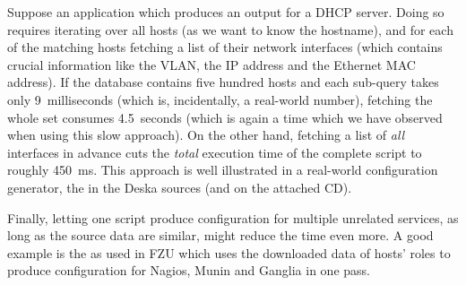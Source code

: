 \documentclass[deska]{subfiles}
\begin{document}
Suppose an application which produces an output for a DHCP server.  Doing so requires iterating over all hosts (as we
want to know the hostname), and for each of the matching hosts fetching a list of their network interfaces (which
contains crucial information like the VLAN, the IP address and the Ethernet MAC address).  If the database contains five
hundred hosts and each sub-query takes only 9~milliseconds (which is, incidentally, a real-world number), fetching the
whole set consumes 4.5~seconds (which is again a time which we have observed when using this slow approach).  On the
other hand, fetching a list of {\em all} interfaces in advance cuts the {\em total} execution time of the complete
script to roughly 450~ms.  This approach is well illustrated in a real-world configuration generator, the
 in the Deska sources (and on the attached CD).

Finally, letting one script produce configuration for multiple unrelated services, as long as the source data are
similar, might reduce the time even more.  A good example is the  as used
in FZU which uses the downloaded data of hosts' roles to produce configuration for Nagios, Munin and Ganglia in one
pass.
\end{document}
